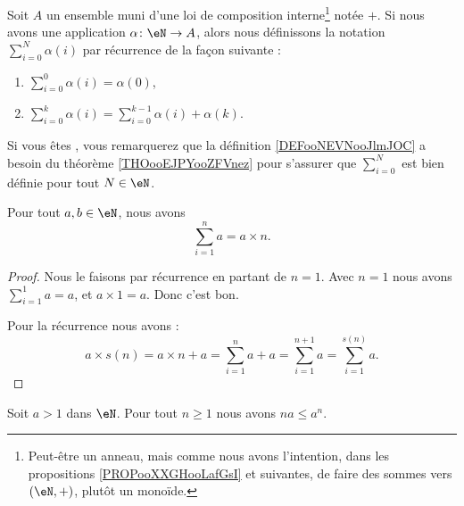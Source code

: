 \begin{definition}      \label{DEFooNEVNooJlmJOC}
    Soit \( A\) un ensemble muni d'une loi de composition interne\footnote{Peut-être un anneau, mais comme nous avons l'intention, dans les propositions \ref{PROPooXXGHooLafGsI} et suivantes, de faire des sommes vers \( (\eN,+)\), plutôt un monoïde.} notée \( +\). Si nous avons une application \( \alpha\colon \eN\to A\), alors nous définissons la notation \( \sum_{i=0}^N\alpha(i)\) par récurrence de la façon suivante :
    \begin{enumerate}
        \item
            \( \sum_{i=0}^0\alpha(i)=\alpha(0)\),
        \item
            \( \sum_{i=0}^{k}\alpha(i)=\sum_{i=0}^{k-1}\alpha(i)+\alpha(k)\).
    \end{enumerate}
\end{definition}

\begin{normaltext}      \label{NORMooKERZooGWhWwo}
    Si vous êtes , vous remarquerez que la définition \ref{DEFooNEVNooJlmJOC} a besoin du théorème \ref{THOooEJPYooZFVnez} pour s'assurer que \( \sum_{i=0}^N\) est bien définie pour tout \( N\in \eN\).
\end{normaltext}

\begin{proposition}        \label{PROPooXXGHooLafGsI}
    Pour tout \( a,b\in \eN\), nous avons
    \begin{equation}
        \sum_{i=1}^na=a\times n.
    \end{equation}
\end{proposition}

\begin{proof}
    Nous le faisons par récurrence en partant de \( n=1\). Avec \( n=1\) nous avons \( \sum_{i=1}^1a=a\), et \( a\times 1=a\). Donc c'est bon.

    Pour la récurrence nous avons :
    \begin{equation}
        a\times s(n)=a\times n+a=\sum_{i=1}^na+a=\sum_{i=1}^{n+1}a=\sum_{i=1}^{s(n)}a.
    \end{equation}
\end{proof}


\begin{lemma}       \label{LEMooIETGooMyrilW}
    Soit \( a>1\) dans \( \eN\). Pour tout \( n\geq 1\) nous avons \( na\leq a^n\).
\end{lemma}

